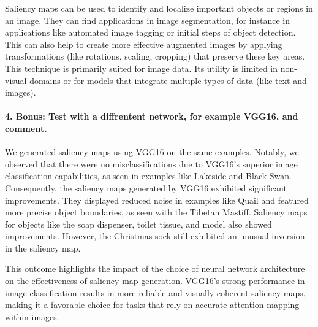 Saliency maps can be used to identify and localize important objects or regions in an image. They can find applications in image segmentation, for instance in applications like automated image tagging or initial steps of object detection. This can also help to create more effective augmented images by applying transformations (like rotations, scaling, cropping) that preserve these key areas. This technique is primarily suited for image data. Its utility is limited in non-visual domains or for models that integrate multiple types of data (like text and images).


\paragraph*{4. \textbf{Bonus:} Test with a diffrentent network, for example VGG16, and comment.} \label{paragraph:bonus_VGG}

We generated saliency maps using VGG16 on the same examples. Notably, we observed that there were no misclassifications due to VGG16's superior image classification capabilities, as seen in examples like Lakeside and Black Swan. Consequently, the saliency maps generated by VGG16 exhibited significant improvements. They displayed reduced noise in examples like Quail and featured more precise object boundaries, as seen with the Tibetan Mastiff. Saliency maps for objects like the soap dispenser, toilet tissue, and model also showed improvements. However, the Christmas sock still exhibited an unusual inversion in the saliency map.

This outcome highlights the impact of the choice of neural network architecture on the effectiveness of saliency map generation. VGG16's strong performance in image classification results in more reliable and visually coherent saliency maps, making it a favorable choice for tasks that rely on accurate attention mapping within images.



